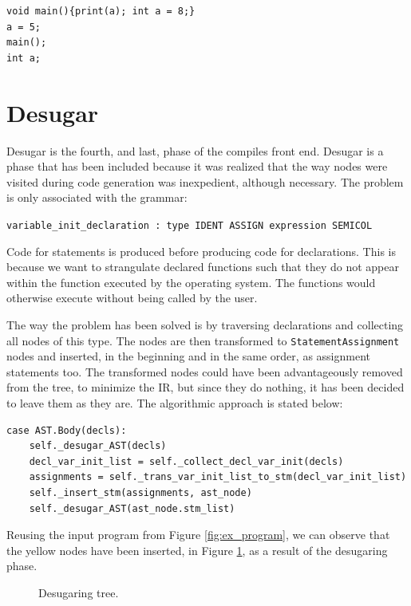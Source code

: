 \begin{verbatim}
void main(){print(a); int a = 8;}
a = 5;
main();
int a;
\end{verbatim}

\section{Desugar}\label{sec:desugar}
Desugar is the fourth, and last, phase of the compiles front end. Desugar is a phase that has been included because it was realized that the way nodes were visited during code generation was inexpedient, although necessary. The problem is only associated with the grammar:

\begin{center}
\texttt{variable\_init\_declaration : type IDENT ASSIGN expression SEMICOL}
\end{center}

Code for statements is produced before producing code for declarations. This is because we want to strangulate declared functions such that they do not appear within the function executed by the operating system. The functions would otherwise execute without being called by the user.

The way the problem has been solved is by traversing declarations and collecting all nodes of this type. The nodes are then transformed to \texttt{StatementAssignment} nodes and inserted, in the beginning and in the same order, as assignment statements too. The transformed nodes could have been advantageously removed from the tree, to minimize the IR, but since they do nothing, it has been decided to leave them as they are. The algorithmic approach is stated below:

\begin{verbatim}
case AST.Body(decls):
    self._desugar_AST(decls)
    decl_var_init_list = self._collect_decl_var_init(decls)
    assignments = self._trans_var_init_list_to_stm(decl_var_init_list)
    self._insert_stm(assignments, ast_node)
    self._desugar_AST(ast_node.stm_list)
\end{verbatim}

Reusing the input program from Figure \ref{fig:ex_program}, we can observe that the yellow nodes have been inserted, in Figure \ref{fig:desugar}, as a result of the desugaring phase.

\begin{figure}[H]
    \centering
    
    \caption{Desugaring tree.} 
    \label{fig:desugar}
\end{figure}

